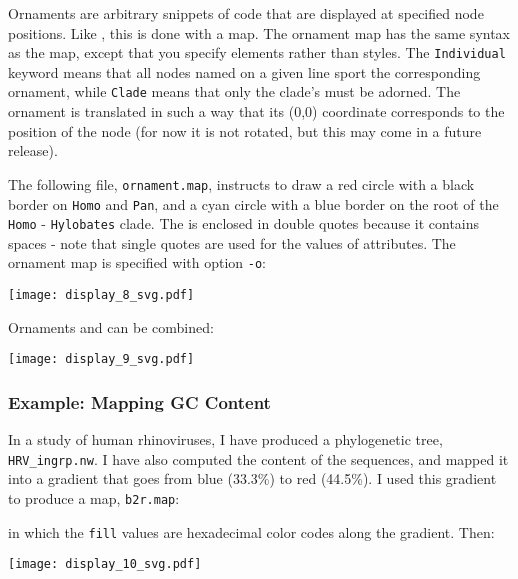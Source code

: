 Ornaments are arbitrary snippets of \svg{} code that are displayed at specified
node positions. Like \css, this is done with a map. The ornament map has the
same syntax as the \css{} map, except that you specify \svg{} elements rather
than \css{} styles. The \texttt{Individual} keyword means that all nodes named
on a given line sport the corresponding ornament, while \texttt{Clade} means
that only the clade's \lca{} must be adorned. The ornament is translated in
such a way that its (0,0) coordinate corresponds to the position of the node (for now it is not rotated, but this may come in a future release).

The following file, \texttt{ornament.map}, instructs to draw a red circle with
a black border on \texttt{Homo} and \texttt{Pan}, and a cyan circle with a blue
border on the root of the \texttt{Homo} - \texttt{Hylobates} clade. The \svg{}
is enclosed in double quotes because it contains spaces - note that single
quotes are used for the values of \xml{} attributes. The ornament map is
specified with option \texttt{-o}:
\begin{quote}
 
\end{quote}

\begin{center}
 \texttt{[image: display\_8\_svg.pdf]}
\end{center}
Ornaments and \css{} can be combined:

\begin{center}
 \texttt{[image: display\_9\_svg.pdf]}
\end{center}

\subsubsection{Example: Mapping GC Content}

In a study of human rhinoviruses, I have produced a phylogenetic tree,
\texttt{HRV\_ingrp.nw}. I have also computed the \gc{} content of the sequences,
and mapped it into a gradient that goes from {\color{Blue} blue} (33.3\%) to
{\color{Red} red} (44.5\%). I used this gradient to produce a \css{} map,
\texttt{b2r.map}:




\noindent{}in which the \texttt{fill} values are hexadecimal color codes along
the gradient. Then:


\texttt{[image: display\_10\_svg.pdf]}
\bigskip{}

